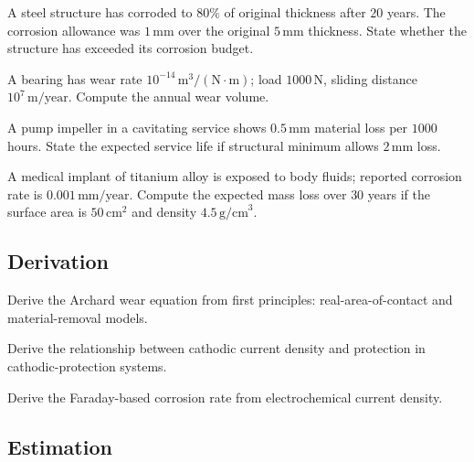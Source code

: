 \begin{exercise}
A steel structure has corroded to $80\%$ of original thickness after $20$ years. The corrosion allowance was $1\,\text{mm}$ over the original $5\,\text{mm}$ thickness. State whether the structure has exceeded its corrosion budget.
\end{exercise}

\begin{exercise}
A bearing has wear rate $10^{-14}\,\text{m}^3/(\text{N}\cdot\text{m})$; load $1000\,\text{N}$, sliding distance $10^7\,\text{m/year}$. Compute the annual wear volume.
\end{exercise}

\begin{exercise}
A pump impeller in a cavitating service shows $0.5\,\text{mm}$ material loss per $1000$ hours. State the expected service life if structural minimum allows $2\,\text{mm}$ loss.
\end{exercise}

\begin{exercise}
A medical implant of titanium alloy is exposed to body fluids; reported corrosion rate is $0.001\,\text{mm/year}$. Compute the expected mass loss over $30$ years if the surface area is $50\,\text{cm}^2$ and density $4.5\,\text{g/cm}^3$.
\end{exercise}

\subsection*{Derivation}

\begin{exercise}
Derive the Archard wear equation from first principles: real-area-of-contact and material-removal models.
\end{exercise}

\begin{exercise}
Derive the relationship between cathodic current density and protection in cathodic-protection systems.
\end{exercise}

\begin{exercise}
Derive the Faraday-based corrosion rate from electrochemical current density.
\end{exercise}

\subsection*{Estimation}

